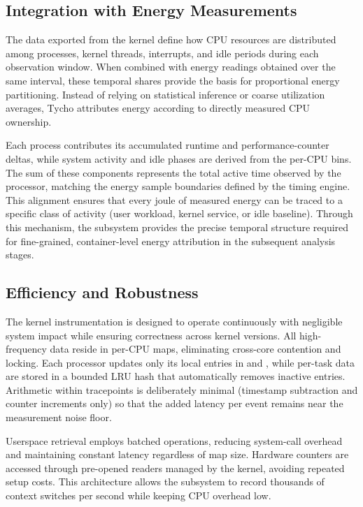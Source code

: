 \subsection{Integration with Energy Measurements}
\label{subsec:ebpf-integration-energy}

The data exported from the kernel define how CPU resources are distributed among processes, kernel threads, interrupts, and idle periods during each observation window.  
When combined with energy readings obtained over the same interval, these temporal shares provide the basis for proportional energy partitioning.  
Instead of relying on statistical inference or coarse utilization averages, Tycho attributes energy according to directly measured CPU ownership.

Each process contributes its accumulated runtime and performance-counter deltas, while system activity and idle phases are derived from the per-CPU bins.  
The sum of these components represents the total active time observed by the processor, matching the energy sample boundaries defined by the timing engine.  
This alignment ensures that every joule of measured energy can be traced to a specific class of activity (user workload, kernel service, or idle baseline).  
Through this mechanism, the  subsystem provides the precise temporal structure required for fine-grained, container-level energy attribution in the subsequent analysis stages.

\subsection{Efficiency and Robustness}
\label{subsec:ebpf-efficiency}

The kernel instrumentation is designed to operate continuously with negligible system impact while ensuring correctness across kernel versions.  
All high-frequency data reside in per-CPU maps, eliminating cross-core contention and locking.  
Each processor updates only its local entries in  and , while per-task data are stored in a bounded LRU hash that automatically removes inactive entries.  
Arithmetic within tracepoints is deliberately minimal (timestamp subtraction and counter increments only) so that the added latency per event remains near the measurement noise floor.

Userspace retrieval employs batched  operations, reducing system-call overhead and maintaining constant latency regardless of map size.  
Hardware counters are accessed through pre-opened  readers managed by the kernel, avoiding repeated setup costs.  
This architecture allows the subsystem to record thousands of context switches per second while keeping CPU overhead low.

